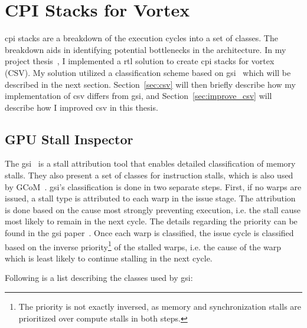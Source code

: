 \chapter{CPI Stacks for Vortex}

\Acrfull{cpi} stacks are a breakdown of the execution cycles into a set of classes. The breakdown aids in identifying potential bottlenecks in the architecture. In my project thesis~\cite{Aurud_Project}, I implemented a \acrfull{rtl} solution to create \acrshort{cpi} stacks for \Gls{vortex} (CSV). My solution utilized a classification scheme based on \acrshort{gsi}~\cite{GSI_GPU_Stall_Inspector} which will be described in the next section. Section~\ref{sec:csv} will then briefly describe how my implementation of \acrshort{csv} differs from \acrshort{gsi}, and Section~\ref{sec:improve_csv} will describe how I improved \acrshort{csv} in this thesis.

\section{GPU Stall Inspector} \label{sec:gsi}

The \acrfull{gsi}~\cite{GSI_GPU_Stall_Inspector} is a stall attribution tool that enables detailed classification of memory stalls. They also present a set of classes for instruction stalls, which is also used by GCoM~\cite{gcom}. \acrshort{gsi}'s classification is done in two separate steps. First, if no warps are issued, a stall type is attributed to each warp in the issue stage. The attribution is done based on the cause most strongly preventing execution, i.e. the stall cause most likely to remain in the next cycle. The details regarding the priority can be found in the \acrshort{gsi} paper~\cite{GSI_GPU_Stall_Inspector}. Once each warp is classified, the issue cycle is classified based on the inverse priority\footnote{The priority is not exactly inversed, as memory and synchronization stalls are prioritized over compute stalls in
both steps.} of the stalled warps, i.e. the cause of the warp which is least likely to continue stalling in the next cycle.

\vspace{1mm}\noindent
Following is a list describing the classes used by \acrshort{gsi}:

